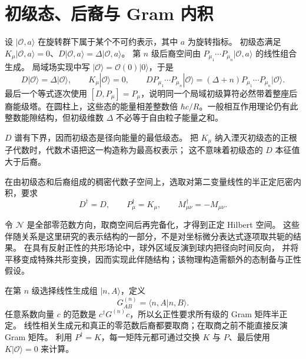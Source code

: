 \section{初级态、后裔与 Gram 内积}

\begin{definition}[初级态与后裔表示]
设 $|\mathcal O,a\rangle$ 在旋转群下属于某个不可约表示，其中 $a$ 为旋转指标。
初级态满足 $K_\mu|\mathcal O,a\rangle=0$、$D|\mathcal O,a\rangle=\Delta|\mathcal O,a\rangle$。
第 $n$ 级后裔空间由 $P_{\mu_1}\cdots P_{\mu_n}|\mathcal O,a\rangle$ 的线性组合生成。
局域场实现中写 $|\mathcal O\rangle=\mathcal O(0)|0\rangle$，于是
\begin{equation}\label{eq:ghs-primary-descendants}
 D|\mathcal O\rangle=\Delta|\mathcal O\rangle,
 \qquad K_\mu|\mathcal O\rangle=0,
 \qquad D P_{\mu_1}\cdots P_{\mu_n}|\mathcal O\rangle
 =(\Delta+n)P_{\mu_1}\cdots P_{\mu_n}|\mathcal O\rangle.
\end{equation}
最后一个等式逐次使用 $[D,P_\mu]=P_\mu$，说明同一个局域初级算符必然带着整座后裔能级塔。在圆柱上，这些态的能量相差整数倍 $\hbar c/R$。一般相互作用理论仍有此整数能隙结构，但初级维数 $\Delta$ 不必等于自由粒子能量之和。

$D$ 谱有下界，因而初级态是径向能量的最低级态。
把 $K_\mu$ 纳入湮灭初级态的正根子代数时，代数术语把这一构造称为最高权表示；
这不意味着初级态的 $D$ 本征值大于后裔。
\end{definition}

\begin{definition}[径向伴随结构]
在由初级态和后裔组成的稠密代数子空间上，选取对第二变量线性的半正定厄密内积，要求
\begin{equation}\label{eq:ghs-radial-generator-adjoint}
 D^\dagger=D,\qquad P_\mu^\dagger=K_\mu,
 \qquad M_{\mu\nu}^\dagger=-M_{\mu\nu}.
\end{equation}

令 $\mathcal N$ 是全部零范数方向，取商空间后再完备化，才得到正定 Hilbert 空间。
这些伴随关系是这里研究的表示结构的一部分，不是对坐标微分表达式逐项取共轭的结果。
在具有反射正性的共形场论中，球外区域反演到球内把径向时间反向，
并将平移变成特殊共形变换，因而实现此伴随结构；该物理构造需额外的态制备与正性假设。
\end{definition}

\begin{definition}[后裔 Gram 矩阵]
在第 $n$ 级选择线性生成组 $|n,A\rangle$，定义
\[
 G^{(n)}_{AB}=\langle n,A|n,B\rangle.
\]
任意系数向量 $c$ 的范数是 $c^\dagger G^{(n)}c$，所以幺正性要求所有级的 Gram 矩阵半正定。
线性相关生成元和真正的零范数后裔都要取商；在取商之前不能直接反演 Gram 矩阵。
利用 $P^\dagger=K$，每一矩阵元都可通过交换 $K$ 与 $P$、最后使用 $K|\mathcal O\rangle=0$ 来计算。
\end{definition}

